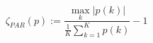 \begin{equation}
	\zeta_{PAR}(p) := \frac{\max_k|p(k)|}{\frac{1}{K}\sum_{k=1}^Kp(k)} - 1
	\label{ch2:equ:cost-par}
\end{equation}